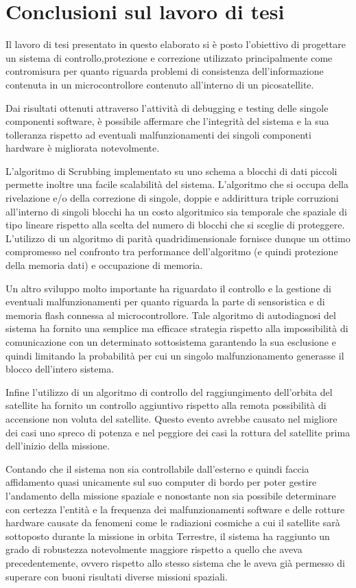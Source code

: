\documentclass[LaM,binding=0.6cm]{../sapthesis}
\begin{document}
\section{Conclusioni sul lavoro di tesi}

Il lavoro di tesi presentato in questo elaborato si è posto l'obiettivo di progettare un sistema di controllo,protezione e correzione
utilizzato principalmente come contromisura per quanto riguarda problemi di consistenza dell'informazione contenuta in un microcontrollore contenuto all'interno di un picosatellite.

Dai risultati ottenuti attraverso l'attività di debugging e testing delle singole componenti software, è possibile affermare che l'integrità 
del sistema e la sua tolleranza rispetto ad eventuali malfunzionamenti dei singoli componenti hardware è migliorata notevolmente.

L'algoritmo di Scrubbing implementato su uno schema a blocchi di dati piccoli permette inoltre una facile scalabilità del sistema. L'algoritmo che
si occupa della rivelazione e/o della correzione di singole, doppie e addirittura triple corruzioni all'interno di
singoli blocchi ha un costo algoritmico sia temporale che spaziale di tipo lineare rispetto alla scelta del numero di blocchi che si sceglie di 
proteggere. L'utilizzo di un algoritmo di parità quadridimensionale fornisce dunque un ottimo compromesso nel confronto tra performance dell'algoritmo (e
quindi protezione della memoria dati) e occupazione di memoria.

Un altro sviluppo molto importante ha riguardato il controllo e la gestione di eventuali malfunzionamenti per quanto riguarda la parte di sensoristica 
e di memoria flash connessa al microcontrollore. Tale algoritmo di autodiagnosi del sistema ha fornito una semplice ma efficace strategia rispetto
alla impossibilità di comunicazione con un determinato sottosistema garantendo la sua esclusione e quindi limitando la probabilità per cui un singolo
malfunzionamento generasse il blocco dell'intero sistema.

Infine l'utilizzo di un algoritmo di controllo del raggiungimento dell'orbita del satellite ha fornito un controllo aggiuntivo rispetto alla remota possibilità
di accensione non voluta del satellite. Questo evento avrebbe causato nel migliore dei casi uno spreco di potenza e nel peggiore dei casi la rottura del satellite
prima dell'inizio della missione.

Contando che il sistema non sia controllabile dall'esterno e quindi faccia affidamento quasi unicamente sul suo computer di bordo per poter gestire 
l'andamento della missione spaziale e nonostante non sia possibile determinare con certezza l'entità e la frequenza dei malfunzionamenti software 
e delle rotture hardware causate da fenomeni come le radiazioni cosmiche a cui il satellite sarà sottoposto durante la missione in orbita Terrestre, 
il sistema ha raggiunto un grado di robustezza notevolmente maggiore rispetto a quello che aveva precedentemente, ovvero rispetto allo stesso sistema che le aveva già permesso 
di superare con buoni risultati diverse missioni spaziali.
\end{document}
